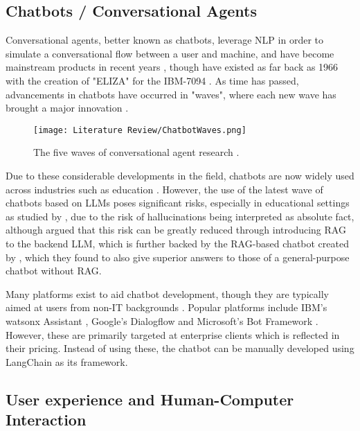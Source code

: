 \subsection{Chatbots / Conversational Agents}

Conversational agents, better known as chatbots, leverage NLP in order to simulate a conversational flow 
between a user and machine, and have become mainstream products in recent years \autocite{liao_all_2018},
though have existed as far back as 1966 with the creation of "ELIZA" for the IBM-7094 \autocite{weizenbaum_elizacomputer_1966}.
As time has passed, advancements in chatbots have occurred in "waves", where each new wave has brought a major innovation \autocite{schobel_charting_2024}.

\begin{figure}[H] 
    \centering
    \texttt{[image: Literature Review/ChatbotWaves.png]}
    \caption{The five waves of conversational agent research \autocite{schobel_charting_2024}.}
    \label{fig:ChatbotWaves}
\end{figure}

Due to these considerable developments in the field, chatbots are now widely used 
across industries such as education \autocite{kuhail_interacting_2023}. However, the use of the latest wave of chatbots based on LLMs
poses significant risks, especially in educational settings as studied by \textcite{neumann_llm-driven_2024},
due to the risk of hallucinations being interpreted as absolute fact, although \textcite{shuster_retrieval_2021} 
argued that this risk can be greatly reduced through introducing RAG to the backend LLM, which is further backed 
by the RAG-based chatbot created by \textcite{ge_development_2023}, which they found to also give superior answers
to those of a general-purpose chatbot without RAG.  


Many platforms exist to aid chatbot development, though they are typically aimed at users from non-IT backgrounds 
\autocite{srivastava_desirable_2020}. Popular platforms include IBM's watsonx Assistant \autocite{ibm_ibm_2024},
Google's Dialogflow \autocite{google_conversational_nodate} and Microsoft's Bot Framework \autocite{microsoft_microsoft_nodate}.
However, these are primarily targeted at enterprise clients which is reflected in their pricing. Instead of using these,
the chatbot can be manually developed using LangChain as its framework.



\subsection{User experience and Human-Computer Interaction}\label{sec:LitReviewHCI}

